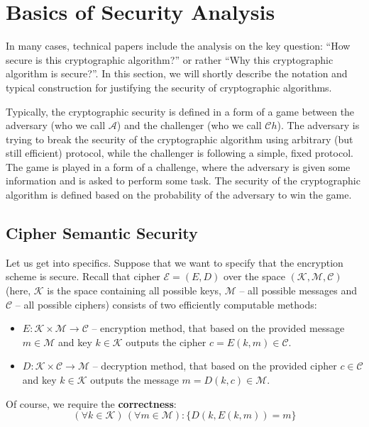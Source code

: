 \documentclass[../lecture-notes.tex]{subfiles}
\begin{document}
\section{Basics of Security Analysis}

In many cases, technical papers include the analysis on the key question: ``How secure is this cryptographic algorithm?'' or rather ``Why this cryptographic algorithm is secure?''. In this section, we will shortly describe the notation and typical construction for justifying the security of cryptographic algorithms.

Typically, the cryptographic security is defined in a form of a game between the adversary (who we call $\mathcal{A}$) and the challenger (who we call $\mathcal{C}h$). The adversary is trying to break the security of the cryptographic algorithm using arbitrary (but still efficient) protocol, while the challenger is following a simple, fixed protocol. The game is played in a form of a challenge, where the adversary is given some information and is asked to perform some task. The security of the cryptographic algorithm is defined based on the probability of the adversary to win the game.

\subsection{Cipher Semantic Security}
Let us get into specifics. Suppose that we want to specify that the encryption scheme is secure. Recall that cipher $\mathcal{E} = (E,D)$ over the space $(\mathcal{K}, \mathcal{M}, \mathcal{C})$ (here, $\mathcal{K}$ is the space containing all possible keys, $\mathcal{M}$ -- all possible messages and $\mathcal{C}$ -- all possible ciphers) consists of two efficiently computable methods:
\begin{itemize}
    \item $E: \mathcal{K} \times \mathcal{M} \to \mathcal{C}$ -- encryption method, that based on the provided message $m \in \mathcal{M}$ and key $k \in \mathcal{K}$ outputs the cipher $c = E(k,m) \in \mathcal{C}$.
    \item $D: \mathcal{K} \times \mathcal{C} \to \mathcal{M}$ -- decryption method, that based on the provided cipher $c \in \mathcal{C}$ and key $k \in \mathcal{K}$ outputs the message $m = D(k,c) \in \mathcal{M}$.
\end{itemize}

Of course, we require the \textbf{correctness}:
\begin{equation}
    (\forall k \in \mathcal{K}) \, (\forall m \in \mathcal{M}): \{D(k,E(k,m)) = m\}
\end{equation}
\end{document}
